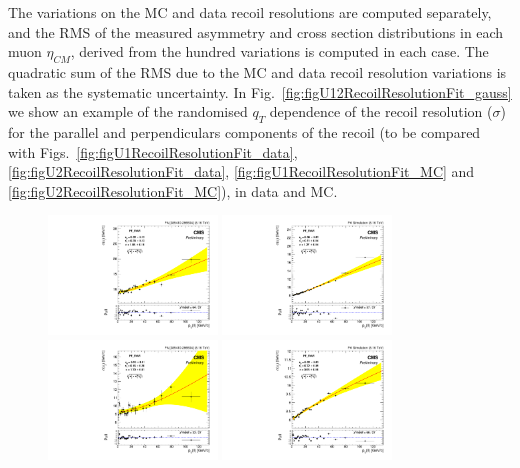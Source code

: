 The variations on the MC and data recoil resolutions are computed separately, and the RMS of the measured asymmetry and cross section distributions in each muon $\eta_{CM}$, derived from the hundred variations is computed in each case. The quadratic sum of the RMS due to the MC and data recoil resolution variations is taken as the systematic uncertainty. In Fig.~\ref{fig:figU12RecoilResolutionFit_gauss} we show an example of the randomised $q_{T}$ dependence of the recoil resolution ($\sigma$) for the parallel and perpendiculars components of the recoil (to be compared with Figs.~\ref{fig:figU1RecoilResolutionFit_data}, \ref{fig:figU2RecoilResolutionFit_data},  \ref{fig:figU1RecoilResolutionFit_MC} and \ref{fig:figU2RecoilResolutionFit_MC}), in data and MC.

\begin{figure} [!htbp]
\begin{center}
\includegraphics[width=0.4\textwidth]{Figures/WBoson/Analysis/Correction/Recoil/Syst/Stat/Data/fitPFu1sigma.pdf}
\includegraphics[width=0.4\textwidth]{Figures/WBoson/Analysis/Correction/Recoil/Syst/Stat/MC/fitPFu1sigma.pdf} \\
\includegraphics[width=0.4\textwidth]{Figures/WBoson/Analysis/Correction/Recoil/Syst/Stat/Data/fitPFu2sigma.pdf}
\includegraphics[width=0.4\textwidth]{Figures/WBoson/Analysis/Correction/Recoil/Syst/Stat/MC/fitPFu2sigma.pdf}

\end{center}
\end{figure}
